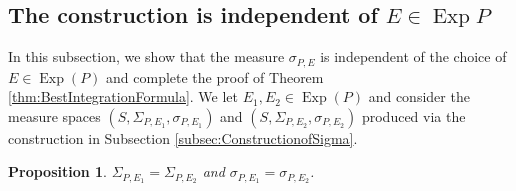 \documentclass[11pt, letter]{book}
\newtheorem{proposition}[theorem]{Proposition}
\newcommand\Exp{\operatorname{Exp}}
\begin{document}
\subsection{The construction is independent of $E\in \Exp{P}$}\label{subsec:IndependentofE}

\noindent In this subsection, we show that the measure $\sigma_{P,E}$ is independent of the choice of $E\in\Exp(P)$ and complete the proof of Theorem \ref{thm:BestIntegrationFormula}. We let $E_1,E_2\in\Exp(P)$ and consider the measure spaces $(S,\Sigma_{P,E_1},\sigma_{P,E_1})$ and $(S,\Sigma_{P,E_2},\sigma_{P,E_2})$ produced via the construction in Subsection \ref{subsec:ConstructionofSigma}. 

\begin{framed}
\begin{proposition}\label{prop:Endependence}
$\Sigma_{P,E_1}=\Sigma_{P,E_2}$ and $\sigma_{P,E_1}=\sigma_{P,E_2}$.
\end{proposition}
\end{framed}
\end{document}
